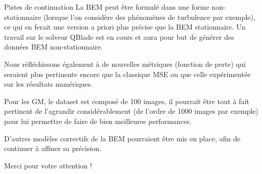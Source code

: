 \documentclass[
11pt,notheorems,hyperref={pdfauthor=whatever}
]{beamer}
\begin{document}
\begin{frame}{Pistes de continuation}
    La BEM peut être formulé dans une forme non-stationnaire (lorsque l'on considère des phénomènes de turbulence par exemple), ce qui en ferait une version a priori plus précise que la BEM 
    stationnaire. Un travail sur le solveur QBlade est en cours et aura pour but de générer des données BEM non-stationnaire. 

    \vspace{0.2cm}

    Nous réfléchissons également à de nouvelles métriques (fonction de perte) qui seraient plus pertinente encore
    que la classique MSE ou que celle expérimentée sur les résultats numériques.

    \vspace{0.2cm}

    Pour les GM, le dataset est composé de 100 images, il pourrait être tout à fait pertinent de l'agrandir 
    considérablement (de l'ordre de 1000 images par exemple) pour lui permettre de faire de bien meilleures performances.

    \vspace{0.2cm}

    D'autres modèles correctifs de la BEM pourraient être mis en place, afin de continuer à affiner sa précision.
\end{frame}

\begin{frame}{Merci pour votre attention !}
    
\end{frame}
\end{document}
